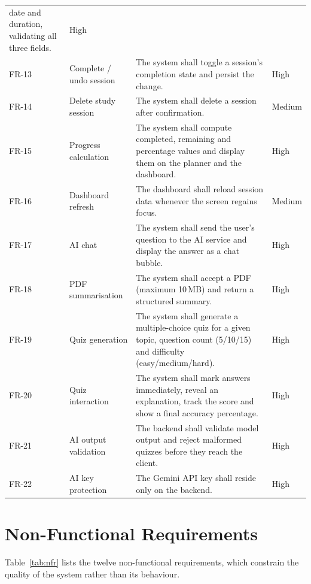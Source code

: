 \documentclass[12pt,a4paper,oneside]{report}
\begin{document}
\begin{longtable}{@{}p{1.5cm}p{4.6cm}p{6.3cm}p{2.1cm}@{}}
   date and duration, validating all three fields. & High \\
FR-13 & Complete / undo session & The system shall toggle a session's completion
   state and persist the change. & High \\
FR-14 & Delete study session & The system shall delete a session after confirmation. & Medium \\
FR-15 & Progress calculation & The system shall compute completed, remaining and
   percentage values and display them on the planner and the dashboard. & High \\
FR-16 & Dashboard refresh & The dashboard shall reload session data whenever the
   screen regains focus. & Medium \\
FR-17 & AI chat & The system shall send the user's question to the AI service and
   display the answer as a chat bubble. & High \\
FR-18 & PDF summarisation & The system shall accept a PDF (maximum 10\,MB) and return
   a structured summary. & High \\
FR-19 & Quiz generation & The system shall generate a multiple-choice quiz for a
   given topic, question count (5/10/15) and difficulty (easy/medium/hard). & High \\
FR-20 & Quiz interaction & The system shall mark answers immediately, reveal an
   explanation, track the score and show a final accuracy percentage. & High \\
FR-21 & AI output validation & The backend shall validate model output and reject
   malformed quizzes before they reach the client. & High \\
FR-22 & AI key protection & The Gemini API key shall reside only on the backend. & High \\
\bottomrule
\end{longtable}

\section{Non-Functional Requirements}

Table~\ref{tab:nfr} lists the twelve non-functional requirements, which constrain the quality of the system rather than its behaviour.
\end{document}
